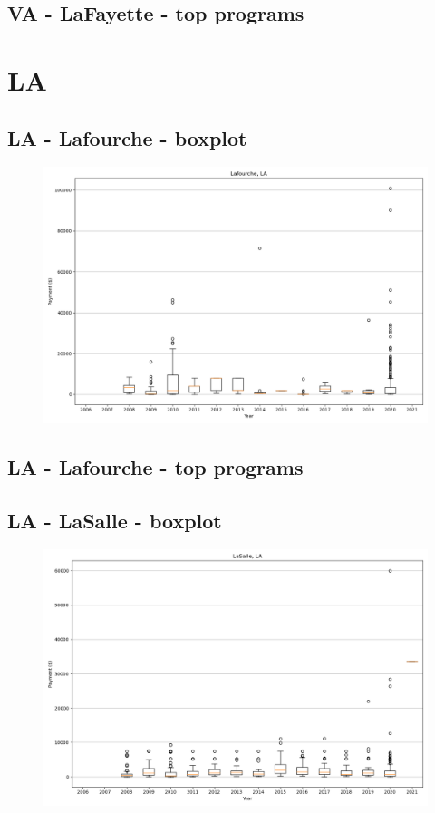 \subsection*{VA - LaFayette - top programs}

\newpage
\section*{LA}
\subsection*{LA - Lafourche - boxplot}
\begin{figure}[h]
\centering
\includegraphics[width=7in]{../output/boxplots/counties/Lafourche-LA_boxplot.png}
\end{figure}


\subsection*{LA - Lafourche - top programs}

\newpage
\subsection*{LA - LaSalle - boxplot}
\begin{figure}[h]
\centering
\includegraphics[width=7in]{../output/boxplots/counties/LaSalle-LA_boxplot.png}
\end{figure}


